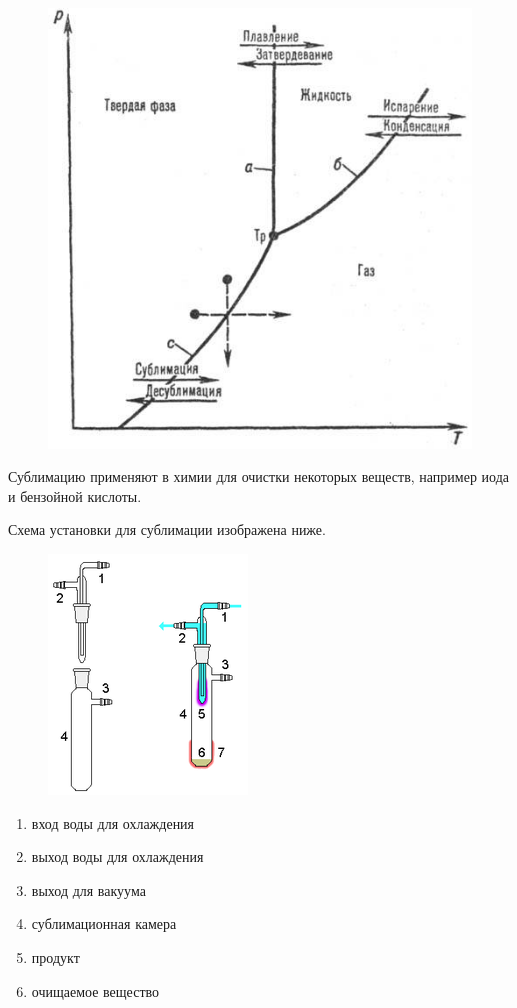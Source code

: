 \documentclass[14pt,a4paper]{scrartcl}
\begin{document}
\begin{figure}[htp]
\centering
\includegraphics[scale=.50]{sublimation.jpg}
\caption{}
\label{}
\end{figure}

Сублимацию применяют в химии для очистки некоторых веществ, например иода и бензойной кислоты.

Схема установки для сублимации изображена ниже.
\begin{figure}[htp]
\centering
\includegraphics[scale=1.50]{sublimation2.png}
\caption{}
\label{}
\end{figure}

\begin{enumerate}
\item вход воды для охлаждения
\item выход воды для охлаждения
\item выход для вакуума
\item сублимационная камера
\item продукт
\item очищаемое вещество
\end{enumerate}
\end{document}
